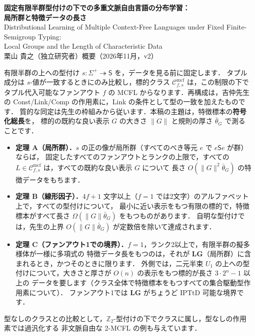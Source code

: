 \documentclass[10pt,a4paper]{ltjsarticle}
\newcommand{\sect}[1]{\par\vspace{0.45em}\noindent{\bfseries\sffamily #1}\par\vspace{0.1em}}
\newcommand{\Cmcf}[2]{\mathcal{C}^{\mathrm{mcf}}_{#1,#2}}
\begin{document}
\begin{center}
{\large\bfseries 固定有限半群型付けの下での多重文脈自由言語の分布学習：\\局所群と特徴データの長さ}\\[0.3em]
{\small Distributional Learning of Multiple Context-Free Languages under Fixed Finite-Semigroup Typing:\\
Local Groups and the Length of Characteristic Data}\\[0.3em]
栗山 貴之（独立研究者）\quad 概要（2026年11月，v2）
\end{center}

\sect{1. 設定}
有限半群の上への型付け $s:\Sigma^+\twoheadrightarrow\mathsf S$ を，データを見る前に固定します．
タプル成分は $s$-値が一致するときにのみ比較し，標的クラス $\Cmcf{f}{s}$ は，この制限の下で
タプル代入可能なファンアウト $f$ の MCFL からなります．再構成は，吉仲先生の
Const/Link/Comp の作用素に，Link の条件として型の一致を加えたものです．
質的な同定は先生の枠組みから従います．本稿の主題は，特徴標本の\textbf{符号化総長}を，
標的の既約な良い表示 $G$ の大きさ $\|G\|$ と規則の厚さ $\bar\theta_G$ で測ることです．

\sect{2. 主結果}
\begin{itemize}
\item \textbf{定理 A（局所群）．}$s$ の正の像が局所群（すべてのべき等元 $e$ で $e\mathsf Se$ が群）ならば，
固定したすべてのファンアウトとランクの上限で，すべての $L\in\Cmcf{f}{s}$ は，すべての既約な良い表示 $G$ について
長さ $O(\|G\|^2\bar\theta_G)$ の特徴データをもちます．
\item \textbf{定理 B（線形因子）．}$4f+1$ 文字以上（$f=1$ では2文字）のアルファベット上で，すべての型付けについて，
最小に近い表示をもつ有限の標的で，特徴標本がすべて長さ $\Omega(\|G\|\bar\theta_G)$ をもつものがあります．
自明な型付けでは，先生の上界 $O(\|G\|\bar\theta_G)$ が定数倍を除いて達成されます．
\item \textbf{定理 C（ファンアウト1での境界）．}$f=1$，ランク2以上で，有限半群の擬多様体が一様に多項式の
特徴データ長をもつのは，それが $\mathbf{LG}$（局所群）に含まれるとき，かつそのときに限ります．
外側では，二元半束 $U_1$ の上への型付けについて，大きさと厚さが $O(n)$ の表示をもつ標的が長さ $3\cdot2^n-1$ 以上の
データを要します（クラス全体で特徴標本をもつすべての集合駆動型作用素について）．
ファンアウト1では $\mathbf{LG}$ がちょうど IPTtD 可能な境界です．
\end{itemize}
型なしのクラスとの比較として，$\mathbb Z_2$-型付けの下でクラスに属し，型なしの作用素では過汎化する
非文脈自由な 2-MCFL の例も与えています．
\end{document}
